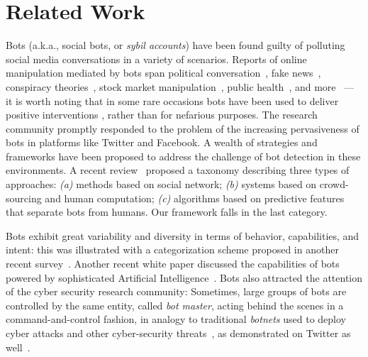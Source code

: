 \section{Related Work}
Bots (a.k.a., social bots, or \textit{sybil accounts}) have been found guilty of polluting social media conversations in a variety of scenarios. Reports of online manipulation mediated by bots span political conversation~\cite{metaxas2012social,forelle2015political,howard2016bots,woolley2016automating,bessi2016social}, fake news~\cite{ferrara2017disinformation,shao2017spread}, conspiracy theories~\cite{subrahmanian2016darpa}, stock market manipulation~\citep{ferrara2015manipulation}, public health~\cite{clark2015vaporous}, and more~\cite{haustein2016tweets} --- it is worth noting that in some rare occasions bots have been used to deliver positive interventions \cite{savage2016botivist,monsted2017evidence}, rather than for nefarious purposes.
The research community promptly responded to the problem of the increasing pervasiveness of bots in platforms like Twitter and Facebook. A wealth of strategies and frameworks have been proposed to address the challenge of bot detection in these environments. A recent review~\cite{ferrara2016rise} proposed a taxonomy describing three types of approaches: \emph{(a)} methods based on social network; \emph{(b)} systems based on crowd-sourcing and human computation; \emph{(c)} algorithms based on predictive features that separate bots from humans. Our framework falls in the last category. 

Bots exhibit great variability and diversity in terms of behavior, capabilities, and intent: this was illustrated with a categorization scheme proposed in another recent survey~\cite{mitter2014categorization}. Another recent white paper discussed the capabilities of bots powered by sophisticated Artificial Intelligence~\cite{adams2017ai}. Bots also attracted the attention of the cyber security research community: Sometimes, large groups of bots are controlled by the same entity, called \textit{bot master}, acting behind the scenes in a command-and-control fashion, in analogy to traditional \textit{botnets} used to deploy cyber attacks and other cyber-security threats~\cite{gu2008botsniffer}, as demonstrated on Twitter as well~\cite{abokhodair2015dissecting,zhou2017starwars}. 

